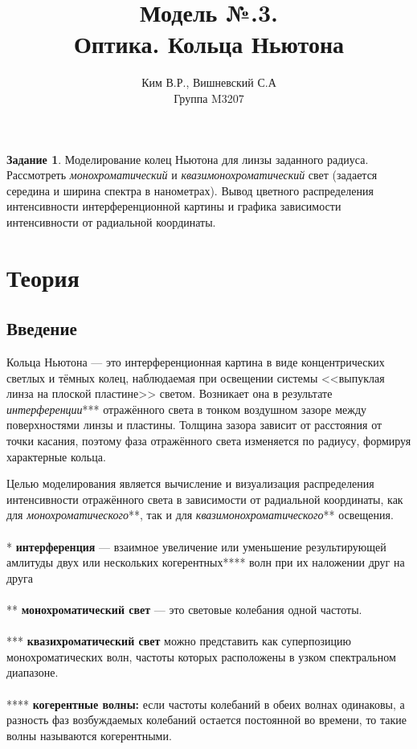 \documentclass[a4paper,11pt]{article}
\title{Модель №.3. \\ Оптика. Кольца Ньютона }
\author{Ким В.Р., Вишневский С.А \\ Группа M3207 }
\date{}
\theoremstyle{definition}
\newtheorem*{task}{Задание}\setlength{\parindent}{0pt}
\begin{document}
    \maketitle

    \begin{task}
        Моделирование колец Ньютона для линзы заданного радиуса.
        Рассмотреть \textit{монохроматический} и \textit{квазимонохроматический} свет
        (задается середина и ширина спектра в нанометрах). Вывод цветного
        распределения интенсивности интерференционной картины и графика
        зависимости интенсивности от радиальной координаты.
    \end{task}


    \section{Теория}

    \subsection{Введение}
    Кольца Ньютона — это интерференционная картина в виде концентрических светлых
    и тёмных колец, наблюдаемая при освещении системы <<выпуклая линза на плоской пластине>> светом.
    Возникает она в результате \textit{интерференции}*** отражённого света в тонком воздушном зазоре между
    поверхностями линзы и пластины. Толщина зазора зависит от расстояния от точки касания,
    поэтому фаза отражённого света изменяется по радиусу, формируя характерные кольца.

    Целью моделирования является вычисление и визуализация распределения интенсивности отражённого света
    в зависимости от радиальной координаты, как для \textit{монохроматического}**, так и для
    \textit{квазимонохроматического}** освещения.
    \\
    \\
    * \textbf{интерференция} — взаимное увеличение или уменьшение результирующей амлитуды двух или нескольких
    когерентных**** волн при их наложении друг на друга
    \\
    \\
    ** \textbf{монохроматический свет} — это световые колебания одной частоты.
    \\
    \\
    *** \textbf{квазихроматический свет} можно представить как суперпозицию монохроматических волн, частоты которых
    расположены в узком спектральном диапазоне.
    \\
    \\
    **** \textbf{когерентные волны:} если частоты колебаний в обеих волнах одинаковы, а разность фаз возбуждаемых колебаний
    остается постоянной во времени, то такие волны называются когерентными.
\end{document}

